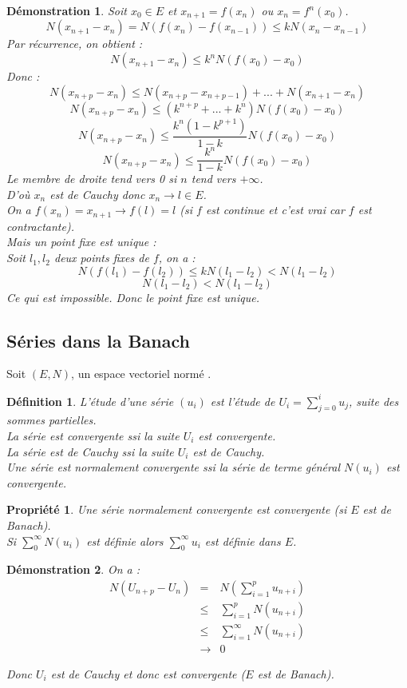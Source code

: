 \documentclass[a4paper, oneside]{report}
\theoremstyle{break}
\newtheorem{defi}[thm]{Définition}
\newtheorem{propr}[thm]{Propriété}
\newtheorem*{demo}{Démonstration}
\newcommand{\evn}{espace vectoriel normé }
\begin{document}
\begin{demo}
Soit $x_0\in E$ et $x_{n+1}=f(x_n)$ ou $x_n=f^n(x_0)$.\\
$$N(x_{n+1}-x_n)=N(f(x_n)-f(x_{n-1}))\leq kN(x_n-x_{n-1})$$
Par récurrence, on obtient :
$$N(x_{n+1}-x_n) \leq k^nN(f(x_0)-x_0)$$
Donc :
$$N(x_{n+p}-x_n)\leq N(x_{n+p}-x_{n+p-1})+...+N(x_{n+1}-x_n)$$
$$N(x_{n+p}-x_n)\leq (k^{n+p}+...+k^n)N(f(x_0)-x_0)$$
$$N(x_{n+p}-x_n)\leq \frac{k^n(1-k^{p+1})}{1-k} N(f(x_0)-x_0)$$
$$N(x_{n+p}-x_n)\leq \frac{k^n}{1-k}N(f(x_0)-x_0)$$
Le membre de droite tend vers 0 si $n$ tend vers $+\infty$.\\
D'où $x_n$ est de Cauchy donc $x_n\rightarrow l \in E$.\\
On a $f(x_n)=x_{n+1}\rightarrow f(l)=l$ (si $f$ est continue et c'est vrai car $f$ est contractante).\\
Mais un point fixe est unique :\\
Soit $l_1,l_2$ deux points fixes de $f$, on a :
$$N(f(l_1)-f(l_2)) \leq kN(l_1-l_2) < N(l_1-l_2)$$
$$N(l_1-l_2) < N(l_1-l_2)$$
Ce qui est impossible. Donc le point fixe est unique.
\end{demo}



\subsection{Séries dans la Banach}

Soit $(E,N)$, un \evn.\\

\begin{defi}
L'étude d'une série $(u_i)$ est l'étude de $U_i=\sum_{j=0}^{i}u_j$, suite des sommes partielles.\\
La série est convergente ssi la suite $U_i$ est convergente.\\
La série est de Cauchy ssi la suite $U_i$ est de Cauchy.\\
Une série est normalement convergente ssi la série de terme général $N(u_i)$ est convergente.
\end{defi}

\begin{propr}
Une série normalement convergente est convergente (si $E$ est de Banach).\\
Si $\sum_{0}^\infty N(u_i)$ est définie alors $\sum_{0}^\infty u_i$ est définie dans $E$.
\end{propr}


\begin{demo}
On a :
$$\begin{array}{lll}
N(U_{n+p}-U_n)&=&N(\sum_{i=1}^p u_{n+i})\\
&\leq & \sum_{i=1}^p N(u_{n+i})\\
&\leq & \sum_{i=1}^\infty N(u_{n+i})\\
&\rightarrow & 0
\end{array}$$

Donc $U_i$ est de Cauchy et donc est convergente ($E$ est de Banach).

\end{demo}
\end{document}
